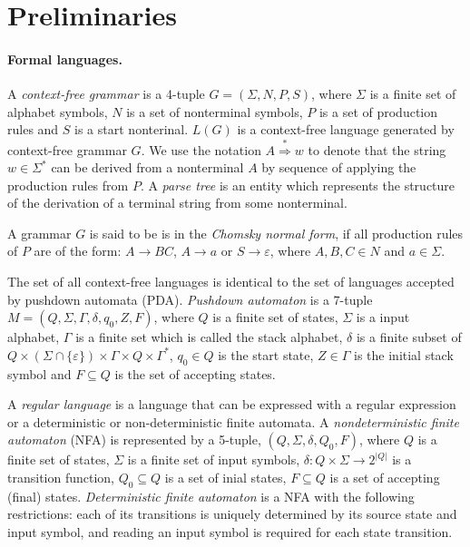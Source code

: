 \section{Preliminaries}
\label{sec:prel}
\label{preliminaries}
\paragraph{Formal languages.} 
A \textit{context-free grammar} is a 4-tuple $G = (\Sigma, N, P, S)$, where $\Sigma$ is a finite set of alphabet symbols,  $N$ is a set of nonterminal symbols, $P$ is a set of production rules and $S$ is a start nonterinal. $L(G)$ is a context-free language generated by context-free grammar $G$. We use the notation $A \stackrel {*}{\Rightarrow } w$  to denote that the string $w \in \Sigma^*$ can be derived from a nonterminal $A$ by sequence of applying the production rules from $P$. A \textit{parse tree} is an entity which represents the structure of the derivation of a terminal string from some nonterminal.


A grammar $G$ is said to be is in the \textit{Chomsky normal form}, if all production rules of $P$ are of the form:
$A \rightarrow BC$, $A \rightarrow a$ or $S \rightarrow \varepsilon$, where $A, B, C \in N$ and $a \in \Sigma$. 


The set of all context-free languages is identical to the set of languages accepted by pushdown automata (PDA). \textit{Pushdown automaton} is a 7-tuple $M = (Q, \Sigma, \Gamma, \delta, q_0, Z, F)$, where $Q$ is a finite set of states, $\Sigma$ is a input alphabet, $\Gamma$ is a finite set which is called the stack alphabet, $\delta$ is a finite subset of $Q \times (\Sigma \cap \{\varepsilon\}) \times \Gamma \times Q \times \Gamma^*$,
$q_{0}\in Q$ is the start state, $Z \in \Gamma$ is the initial stack symbol and
$F\subseteq Q$ is the set of accepting states.


A \textit{regular language} is a language that can be expressed with a regular expression or a deterministic or non-deterministic finite automata.
A \textit{nondeterministic finite automaton} (NFA) is represented by a 5-tuple, $(Q,\Sigma ,\delta ,Q_{0},F)$, where $Q$ is a finite set of states, $\Sigma$ is a finite set of input symbols, $\delta:Q\times \Sigma \rightarrow 2^{|Q|}$ is a transition function, $Q_0 \subseteq Q$ is a set of inial states, $F \subseteq Q$ is a set of accepting (final) states. \textit{Deterministic finite automaton} is a NFA with the following restrictions: each of its transitions is uniquely determined by its source state and input symbol, and reading an input symbol is required for each state transition.



